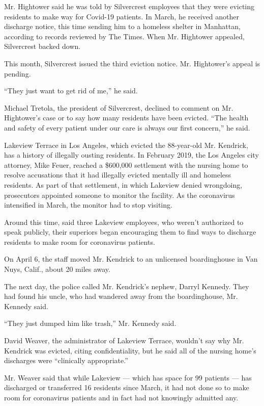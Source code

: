 Mr. Hightower said he was told by Silvercrest employees that they were
evicting residents to make way for Covid-19 patients. In March, he
received another discharge notice, this time sending him to a homeless
shelter in Manhattan, according to records reviewed by The Times. When
Mr. Hightower appealed, Silvercrest backed down.

This month, Silvercrest issued the third eviction notice. Mr.
Hightower's appeal is pending.

``They just want to get rid of me,'' he said.

Michael Tretola, the president of Silvercrest, declined to comment on
Mr. Hightower's case or to say how many residents have been evicted.
``The health and safety of every patient under our care is always our
first concern,'' he said.

Lakeview Terrace in Los Angeles, which evicted the 88-year-old Mr.
Kendrick, has a history of illegally ousting residents. In February
2019, the Los Angeles city attorney, Mike Feuer, reached a \$600,000
settlement with the nursing home to resolve accusations that it had
illegally evicted mentally ill and homeless residents. As part of that
settlement, in which Lakeview denied wrongdoing, prosecutors appointed
someone to monitor the facility. As the coronavirus intensified in
March, the monitor had to stop visiting.

Around this time, said three Lakeview employees, who weren't authorized
to speak publicly, their superiors began encouraging them to find ways
to discharge residents to make room for coronavirus patients.

On April 6, the staff moved Mr. Kendrick to an unlicensed boardinghouse
in Van Nuys, Calif., about 20 miles away.

The next day, the police called Mr. Kendrick's nephew, Darryl Kennedy.
They had found his uncle, who had wandered away from the boardinghouse,
Mr. Kennedy said.

``They just dumped him like trash,'' Mr. Kennedy said.

David Weaver, the administrator of Lakeview Terrace, wouldn't say why
Mr. Kendrick was evicted, citing confidentiality, but he said all of the
nursing home's discharges were ``clinically appropriate.''

Mr. Weaver said that while Lakeview --- which has space for 99 patients
--- has discharged or transferred 16 residents since March, it had not
done so to make room for coronavirus patients and in fact had not
knowingly admitted any.

